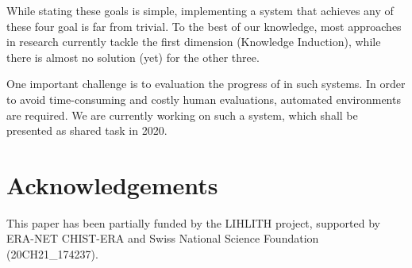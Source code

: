 \documentclass{lihlith}
\theoremstyle{definition}
\theoremstyle{remark}
\begin{document}
While stating these goals is simple, implementing a system that achieves any of these four goal is far from trivial. To the best of our knowledge, most approaches in research currently tackle the first dimension (Knowledge Induction), while there is almost no solution (yet) for the other three.

One important challenge is to evaluation the progress of \LLL in such systems. In order to avoid time-consuming and costly human evaluations, automated environments are required. We are currently working on such a system, which shall be presented as shared task in 2020. 


\section{Acknowledgements}
This paper has been partially funded by the LIHLITH project, supported by ERA-NET CHIST-ERA and Swiss National Science Foundation (20CH21\_174237). 







\clearpage
{}

\end{document}
